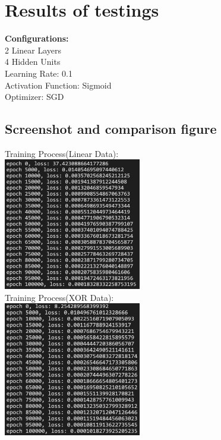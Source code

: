 \documentclass{article} %
\begin{document}
    \section{Results of testings}
    \textbf{Configurations:} \\
    2 Linear Layers \\ 
    4 Hidden Units \\
    Learning Rate: 0.1 \\
    Activation Function: Sigmoid \\
    Optimizer: SGD \\
    \subsection{Screenshot and comparison figure}
    Training Process(Linear Data): \\
    \includegraphics[width=6cm]{./imgs/linear_train.png} \\
    
    Training Process(XOR Data): \\
    \includegraphics[width=6cm]{./imgs/xor_train.png} \\
     
    
\end{document}
